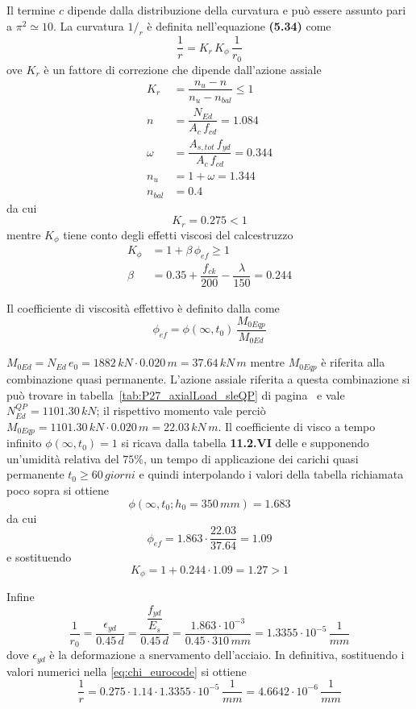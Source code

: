 Il termine $c$ dipende dalla distribuzione della curvatura e può essere assunto pari a $\pi^2 \simeq 10$. La curvatura $1/_r$ è definita nell'equazione \textbf{(5.34)} come
\begin{equation}
    \label{eq:chi_eurocode}
	\dfrac{1}{r} = K_r\,K_\phi\,\dfrac{1}{r_0}
\end{equation}
ove $K_r$ è un fattore di correzione che dipende dall'azione assiale
\begin{align*}
K_r &= \dfrac{n_u-n}{n_u - n_{bal}} \leq 1\\
n &= \dfrac{N_{Ed}}{A_c\,f_{cd}} = 1.084\\
\omega &= \dfrac{A_{s,tot}\,f_{yd}}{A_c\,f_{cd}} = 0.344\\
n_u &= 1+\omega = 1.344\\
n_{bal} &= 0.4
\end{align*}
da cui
\[
    K_r = 0.275 < 1
\]
mentre $K_\phi$ tiene conto degli effetti viscosi del calcestruzzo
\begin{align*}
	K_\phi &= 1 + \beta\,\phi_{ef} \geq 1\\
	\beta &= 0.35 + \dfrac{f_{ck}}{200}  - \dfrac{\lambda}{150} = 0.244
\end{align*}

Il coefficiente di viscosità effettivo è definito dalla \ec come
\[
\phi_{ef}  = \phi(\infty, t_0)\,\dfrac{M_{0Eqp}}{M_{0Ed}}
\]

$M_{0Ed} = N_{Ed}\,e_0 = 1882\,kN\cdot 0.020\,m = 37.64\,kN\,m$ mentre $M_{0Eqp}$ è riferita alla combinazione quasi permanente. L'azione assiale riferita a questa combinazione si può trovare in tabella~\ref{tab:P27_axialLoad_sleQP} di pagina~\pageref{tab:P27_axialLoad_sleQP} e vale $N_{Ed}^{QP} = 1101.30\,kN$; il rispettivo momento vale perciò $M_{0Eqp} = 1101.30\,kN\cdot 0.020\,m = 22.03\,kN\,m$. Il coefficiente di visco a tempo infinito $\phi (\infty, t_0) = 1$ si ricava dalla tabella \textbf{11.2.VI} delle \ntc e supponendo un'umidità relativa del $75\%$, un tempo di applicazione dei carichi quasi permanente $t_0 \geq 60\,giorni$ e quindi interpolando i valori della tabella richiamata poco sopra si ottiene 
\[
\phi(\infty, t_0; h_0 = 350\,mm) = 1.683
\]
da cui
\[
\phi_{ef} = 1.863\cdot\dfrac{22.03}{37.64} = 1.09 
\]
e sostituendo
\[
    K_\phi = 1+ 0.244\cdot 1.09 = 1.27 > 1
\]

Infine
\[
\dfrac{1}{r_0} = \dfrac{\epsilon_{yd}}{0.45\,d} = \dfrac{\dfrac{f_{yd}}{E_s}}{0.45\,d} = \dfrac{1.863\cdot 10^{-3}}{0.45\cdot 310\,mm} = 1.3355\cdot 10^{-5}\,\dfrac{1}{mm}
\]
dove $\epsilon_{yd}$ è la deformazione a snervamento dell'acciaio. In definitiva, sostituendo i valori numerici nella \eqref{eq:chi_eurocode} si ottiene
\begin{equation}
    \label{eq:chi_value}
	\dfrac{1}{r} = 0.275\cdot 1.14\cdot 1.3355\cdot 10^{-5}\,\dfrac{1}{mm} = 4.6642\cdot 10^{-6}\,\dfrac{1}{mm}
\end{equation}

